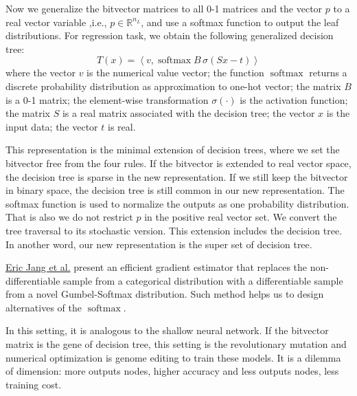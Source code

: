 \documentclass[UTF8]{article}
\begin{document}
Now we generalize the bitvector matrices to all 0-1 matrices
and the vector $p$ to a real vector variable ,i.e., $p\in\mathbb{R}^{n_L}$,
and use a softmax function to output the leaf distributions.
For regression task, we obtain the following generalized decision tree:
\begin{equation}\label{GT}
T(x)=\left<v, \operatorname{softmax}{B\,\sigma(Sx-t)}\right>
\end{equation}
where the vector $v$ is the numerical value vector;
the function $\operatorname{softmax}$ returns a discrete probability distribution
as approximation to one-hot vector;
the matrix $B$ is a 0-1 matrix;
the element-wise transformation $\sigma(\cdot)$ is the activation function;
the matrix $S$ is a real matrix associated with the decision tree;
the vector $x$ is the input data;
the vector $t$ is real.

This representation is the minimal extension of decision trees,
where we  set the bitvector free from the four rules.
If the bitvector is extended to real vector space,
the decision tree is sparse in the new representation.
If we still keep the bitvector in binary space,
the decision tree is still common in our new representation.
The softmax function is used to normalize the outputs as one probability distribution.
That is also we do not restrict $p$ in the positive real vector set.
We convert the tree traversal to its stochastic version.
This extension includes the decision tree.
In another word, our new representation is the super set of decision tree.

\href{https://arxiv.org/pdf/1611.01144.pdf}{Eric Jang et al.} present an
efficient gradient estimator that replaces the non-differentiable sample
from a categorical distribution with a differentiable sample
from a novel Gumbel-Softmax distribution.
Such method helps us to design alternatives of the $\operatorname{softmax}$.

In this setting, it is analogous to the shallow  neural network.
If the bitvector matrix is the gene of decision tree,
this setting is the revolutionary mutation and
numerical optimization  is genome editing to train these models.
It is a dilemma of dimension: more outputs nodes, higher accuracy and less outputs nodes, less training cost.
\end{document}
